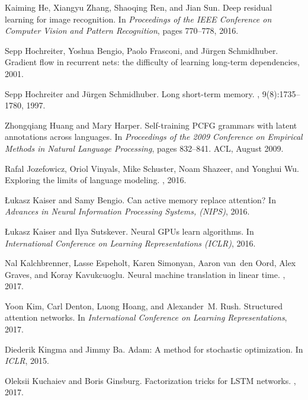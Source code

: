 \documentclass{article}
\begin{document}
\begin{thebibliography}{10}
Kaiming He, Xiangyu Zhang, Shaoqing Ren, and Jian Sun.
\newblock Deep residual learning for image recognition.
\newblock In {\em Proceedings of the IEEE Conference on Computer Vision and
  Pattern Recognition}, pages 770--778, 2016.

Sepp Hochreiter, Yoshua Bengio, Paolo Frasconi, and J{\"u}rgen Schmidhuber.
\newblock Gradient flow in recurrent nets: the difficulty of learning long-term
  dependencies, 2001.

Sepp Hochreiter and J{\"u}rgen Schmidhuber.
\newblock Long short-term memory.
, 9(8):1735--1780, 1997.

Zhongqiang Huang and Mary Harper.
\newblock Self-training {PCFG} grammars with latent annotations across
  languages.
\newblock In {\em Proceedings of the 2009 Conference on Empirical Methods in
  Natural Language Processing}, pages 832--841. ACL, August 2009.

Rafal Jozefowicz, Oriol Vinyals, Mike Schuster, Noam Shazeer, and Yonghui Wu.
\newblock Exploring the limits of language modeling.
, 2016.

{\L}ukasz Kaiser and Samy Bengio.
\newblock Can active memory replace attention?
\newblock In {\em Advances in Neural Information Processing Systems, ({NIPS})},
  2016.

\L{}ukasz Kaiser and Ilya Sutskever.
\newblock Neural {GPU}s learn algorithms.
\newblock In {\em International Conference on Learning Representations
  ({ICLR})}, 2016.

Nal Kalchbrenner, Lasse Espeholt, Karen Simonyan, Aaron van~den Oord, Alex
  Graves, and Koray Kavukcuoglu.
\newblock Neural machine translation in linear time.
, 2017.

Yoon Kim, Carl Denton, Luong Hoang, and Alexander~M. Rush.
\newblock Structured attention networks.
\newblock In {\em International Conference on Learning Representations}, 2017.

Diederik Kingma and Jimmy Ba.
\newblock Adam: A method for stochastic optimization.
\newblock In {\em ICLR}, 2015.

Oleksii Kuchaiev and Boris Ginsburg.
\newblock Factorization tricks for {LSTM} networks.
, 2017.


\end{thebibliography}
\end{document}
